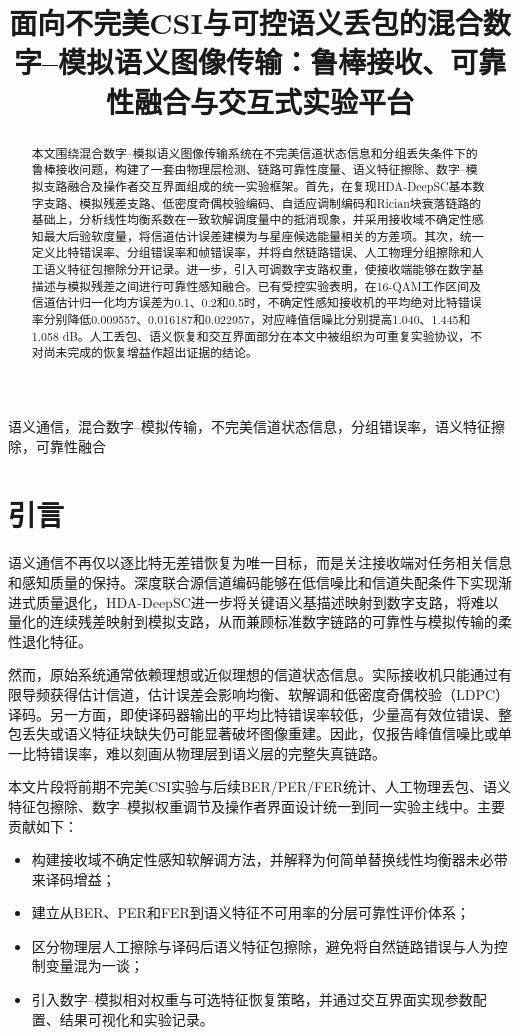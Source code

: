 \documentclass[conference]{IEEEtran}
\title{面向不完美CSI与可控语义丢包的混合数字--模拟语义图像传输：鲁棒接收、可靠性融合与交互式实验平台}
\author{%
\IEEEauthorblockN{作者姓名（待填写）}
\IEEEauthorblockA{学院与学校名称（待填写）\\
城市，国家\\
电子邮箱（待填写）}
}
\begin{document}
\maketitle

\begin{abstract}
本文围绕混合数字--模拟语义图像传输系统在不完美信道状态信息和分组丢失条件下的鲁棒接收问题，构建了一套由物理层检测、链路可靠性度量、语义特征擦除、数字--模拟支路融合及操作者交互界面组成的统一实验框架。首先，在复现HDA-DeepSC基本数字支路、模拟残差支路、低密度奇偶校验编码、自适应调制编码和Rician块衰落链路的基础上，分析线性均衡系数在一致软解调度量中的抵消现象，并采用接收域不确定性感知最大后验软度量，将信道估计误差建模为与星座候选能量相关的方差项。其次，统一定义比特错误率、分组错误率和帧错误率，并将自然链路错误、人工物理分组擦除和人工语义特征包擦除分开记录。进一步，引入可调数字支路权重，使接收端能够在数字基描述与模拟残差之间进行可靠性感知融合。已有受控实验表明，在16-QAM工作区间及信道估计归一化均方误差为0.1、0.2和0.5时，不确定性感知接收机的平均绝对比特错误率分别降低0.009557、0.016187和0.022957，对应峰值信噪比分别提高1.040、1.445和1.058 dB。人工丢包、语义恢复和交互界面部分在本文中被组织为可重复实验协议，不对尚未完成的恢复增益作超出证据的结论。
\end{abstract}

\begin{IEEEkeywords}
语义通信，混合数字--模拟传输，不完美信道状态信息，分组错误率，语义特征擦除，可靠性融合
\end{IEEEkeywords}

\section{引言}
语义通信不再仅以逐比特无差错恢复为唯一目标，而是关注接收端对任务相关信息和感知质量的保持。深度联合源信道编码能够在低信噪比和信道失配条件下实现渐进式质量退化，HDA-DeepSC进一步将关键语义基描述映射到数字支路，将难以量化的连续残差映射到模拟支路，从而兼顾标准数字链路的可靠性与模拟传输的柔性退化特征\cite{xie2021deepsc,bourtsoulatze2019deepjscc,xie2025hda}。

然而，原始系统通常依赖理想或近似理想的信道状态信息。实际接收机只能通过有限导频获得估计信道，估计误差会影响均衡、软解调和低密度奇偶校验（LDPC）译码。另一方面，即使译码器输出的平均比特错误率较低，少量高有效位错误、整包丢失或语义特征块缺失仍可能显著破坏图像重建。因此，仅报告峰值信噪比或单一比特错误率，难以刻画从物理层到语义层的完整失真链路。

本文片段将前期不完美CSI实验与后续BER/PER/FER统计、人工物理丢包、语义特征包擦除、数字--模拟权重调节及操作者界面设计统一到同一实验主线中。主要贡献如下：
\begin{itemize}
    \item 构建接收域不确定性感知软解调方法，并解释为何简单替换线性均衡器未必带来译码增益；
    \item 建立从BER、PER和FER到语义特征不可用率的分层可靠性评价体系；
    \item 区分物理层人工擦除与译码后语义特征包擦除，避免将自然链路错误与人为控制变量混为一谈；
    \item 引入数字--模拟相对权重与可选特征恢复策略，并通过交互界面实现参数配置、结果可视化和实验记录。
\end{itemize}
\end{document}
